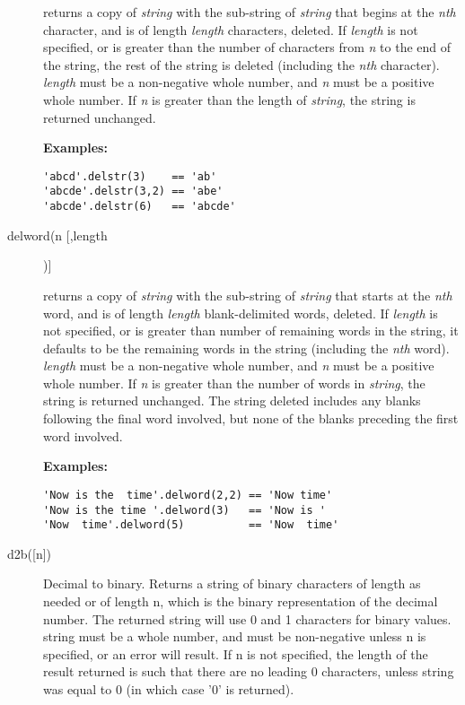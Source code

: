 \begin{description}
returns a copy of \emph{string} with the sub-string of
\emph{string} that begins at the \emph{n}\emph{th} character, and is
of length \emph{length} characters, deleted.
If \emph{length} is not specified, or is greater than the number of
characters from \emph{n} to the end of the string, the rest of the
string is deleted (including the \emph{n}\emph{th} character).
\emph{length} must be a non-negative whole number, and \emph{n}
must be a positive whole number.  If \emph{n} is greater than the
length of \emph{string}, the string is returned unchanged.
 
\textbf{Examples:}
\begin{lstlisting}
'abcd'.delstr(3)    == 'ab'
'abcde'.delstr(3,2) == 'abe'
'abcde'.delstr(6)   == 'abcde'
\end{lstlisting}
\item[delword(n [,length])]\label{refdelword}

returns a copy of \emph{string} with the sub-string of
\emph{string} that starts at the \emph{n}\emph{th} word, and is of
length \emph{length} blank-delimited words, deleted.
If \emph{length} is not specified, or is greater than number of
remaining words in the string, it defaults to be the remaining words
in the string (including the \emph{n}\emph{th} word).
\emph{length} must be a non-negative whole number, and \emph{n}
must be a positive whole number.  If \emph{n} is greater than the
number of words in \emph{string}, the string is returned unchanged.
The string deleted includes any blanks following the final word
involved, but none of the blanks preceding the first word involved.
 
\textbf{Examples:}
\begin{lstlisting}
'Now is the  time'.delword(2,2) == 'Now time'
'Now is the time '.delword(3)   == 'Now is '
'Now  time'.delword(5)          == 'Now  time'
\end{lstlisting}

\item[d2b([n{]})]\label{refd2b}
 Decimal to binary.
Returns a string of binary characters of length as needed or of length
n, which is the binary representation of the decimal number. The
returned string will use 0 and 1 characters for binary values. string
must be a whole number, and must be non-negative unless n is
specified, or an error will result. If n is not specified, the length
of the result returned is such that there are no leading 0 characters,
unless string was equal to 0 (in which case '0' is returned).


\end{description}
